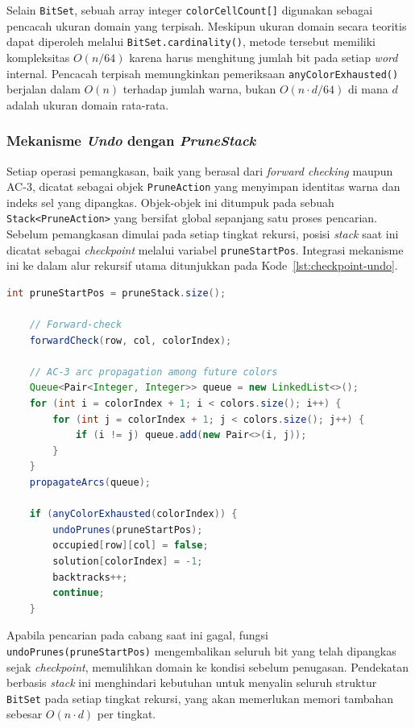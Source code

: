 Selain \texttt{BitSet}, sebuah array integer \texttt{colorCellCount[]} digunakan sebagai pencacah ukuran domain yang terpisah. Meskipun ukuran domain secara teoritis dapat diperoleh melalui \texttt{BitSet.cardinality()}, metode tersebut memiliki kompleksitas $O(n/64)$ karena harus menghitung jumlah bit pada setiap \textit{word} internal. Pencacah terpisah memungkinkan pemeriksaan \texttt{anyColorExhausted()} berjalan dalam $O(n)$ terhadap jumlah warna, bukan $O(n \cdot d/64)$ di mana $d$ adalah ukuran domain rata-rata.

\subsubsection{Mekanisme \textit{Undo} dengan \textit{PruneStack}}

Setiap operasi pemangkasan, baik yang berasal dari \textit{forward checking} maupun AC-3, dicatat sebagai objek \texttt{PruneAction} yang menyimpan identitas warna dan indeks sel yang dipangkas. Objek-objek ini ditumpuk pada sebuah \texttt{Stack<PruneAction>} yang bersifat global sepanjang satu proses pencarian. Sebelum pemangkasan dimulai pada setiap tingkat rekursi, posisi \textit{stack} saat ini dicatat sebagai \textit{checkpoint} melalui variabel \texttt{pruneStartPos}. Integrasi mekanisme ini ke dalam alur rekursif utama ditunjukkan pada Kode~\ref{lst:checkpoint-undo}.

\begin{lstlisting}[language=Java, caption=Integrasi \textit{checkpoint} dan \textit{undo} pada alur rekursif utama, label={lst:checkpoint-undo}]
	int pruneStartPos = pruneStack.size();
	
	// Forward-check
	forwardCheck(row, col, colorIndex);
	
	// AC-3 arc propagation among future colors
	Queue<Pair<Integer, Integer>> queue = new LinkedList<>();
	for (int i = colorIndex + 1; i < colors.size(); i++) {
		for (int j = colorIndex + 1; j < colors.size(); j++) {
			if (i != j) queue.add(new Pair<>(i, j));
		}
	}
	propagateArcs(queue);
	
	if (anyColorExhausted(colorIndex)) {
		undoPrunes(pruneStartPos);
		occupied[row][col] = false;
		solution[colorIndex] = -1;
		backtracks++;
		continue;
	}
\end{lstlisting}

Apabila pencarian pada cabang saat ini gagal, fungsi \texttt{undoPrunes(pruneStartPos)} mengembalikan seluruh bit yang telah dipangkas sejak \textit{checkpoint}, memulihkan domain ke kondisi sebelum penugasan. Pendekatan berbasis \textit{stack} ini menghindari kebutuhan untuk menyalin seluruh struktur \texttt{BitSet} pada setiap tingkat rekursi, yang akan memerlukan memori tambahan sebesar $O(n \cdot d)$ per tingkat.

